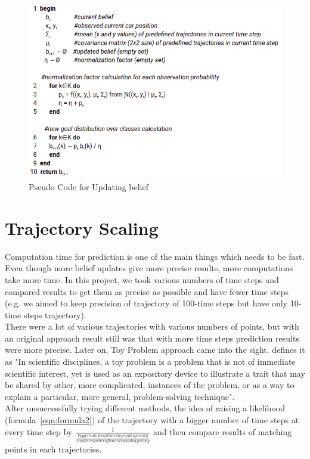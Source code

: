 \begin{figure}[h]
	\centering  	
	\includegraphics[width=13cm]{img/pseudo_belief update.jpg}
	\caption{Pseudo Code for Updating belief}
	\label{fig:PseudoBelief}    
\end{figure}

\section{Trajectory Scaling}

Computation time for prediction is one of the main things which needs to be fast. Even though more belief updates give more precise results, more computations take more time. In this project, we took various numbers of time steps and compared results to get them as precise as possible and have fewer time steps (e.g. we aimed to keep precision of trajectory of 100-time steps but have only 10-time steps trajectory). \\

There were a lot of various trajectories with various numbers of points, but with an original approach result still was that with more time steps prediction results were more precise. Later on, Toy Problem approach came into the sight. \cite{ToyPr} defines it as "In scientific disciplines, a toy problem is a problem that is not of immediate scientific interest, yet is used as an expository device to illustrate a trait that may be shared by other, more complicated, instances of the problem, or as a way to explain a particular, more general, problem-solving technique". \\

After unsuccessfully trying different methods, the idea of raising a likelihood (formula~\ref{eqn:formula2}) of the trajectory with a bigger number of time steps at every time step by $\frac{1}{\frac{bigger number of time steps in trajectory}{smaller number of time steps in trajectory}}$ and then compare results of matching points in each trajectories. \\

